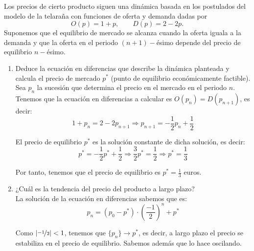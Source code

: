 \begin{ejercicio} \label{ej:1.11}
    Los precios de cierto producto siguen una dinámica basada en los postulados del modelo de la telaraña con funciones de oferta y demanda dadas por
    \begin{equation*}
        O(p)=1+p,\qquad D(p)=2-2p.
    \end{equation*}
    Suponemos que el equilibrio de mercado se alcanza cuando la oferta iguala a la demanda y que la oferta en el periodo $(n + 1)-$ésimo depende del precio de equilibrio $n-$ésimo.
    \begin{enumerate}
        \item Deduce la ecuación en diferencias que describe la dinámica planteada y calcula el precio de mercado $p^\ast$ (punto de equilibrio económicamente factible).\\

        Sea $p_n$ la sucesión que determina el precio en el mercado en el periodo $n$. Tenemos que la ecuación en diferencias a calcular es $O(p_{n})=D(p_{n+1})$, es decir:
        \begin{equation*}
            1+p_n = 2-2p_{n+1} \Longrightarrow p_{n+1} = -\frac{1}{2}p_n +\frac{1}{2}
        \end{equation*}

        El precio de equilibrio $p^\ast$ es la solución constante de dicha solución, es decir:
        \begin{equation*}
            p^\ast = -\frac{1}{2}p^\ast +\frac{1}{2} \Longrightarrow \frac{3}{2}p^\ast = \frac{1}{2}
            \Longrightarrow p^\ast = \frac{1}{3}
        \end{equation*}

        Por tanto, tenemos que el precio de equilibrio es $p^\ast = \frac{1}{3}$ euros.
        
        \item ¿Cuál es la tendencia del precio del producto a largo plazo?\\

        La solución de la ecuación en diferencias sabemos que es:
        \begin{equation*}
            p_{n} = (p_0-p^\ast)\cdot \left(\frac{-1}{2}\right)^n + p^\ast
        \end{equation*}

        Como $\left|\nicefrac{-1}{2}\right|<1$, tenemos que $\{p_n\}\to p^\ast$, es decir, a largo plazo el precio se estabiliza en el precio de equilibrio. Sabemos además que lo hace oscilando.
        

\end{enumerate}
\end{ejercicio}
